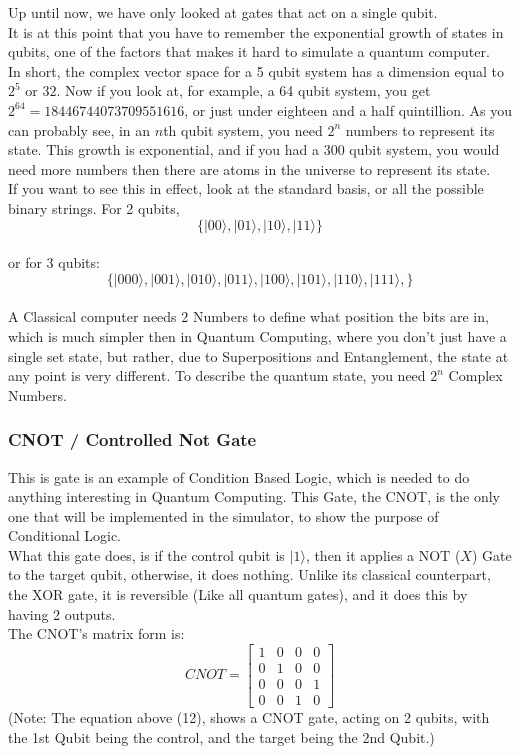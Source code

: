\documentclass[../main.tex]{subfiles}
\begin{document}
Up until now, we have only looked at gates that act on a single qubit.\\
It is at this point that you have to remember the exponential growth of
states in qubits, one of the factors that makes it hard to simulate a
quantum computer.\\
In short, the complex vector space for a 5 qubit system has a dimension
equal to \(2^5\) or \(32\). Now if you look at, for example, a 64 qubit
system, you get \(2^{64} = 18446744073709551616\), or just under eighteen
and a half quintillion. As you can probably see, in an \(n\)th qubit
system, you need \(2^n\) numbers to represent its state. This growth is
exponential, and if you had a \(300\) qubit system, you would need more
numbers then there are atoms in the universe to represent its state.\\
If you want to see this in effect, look at the standard basis, or all
the possible binary strings. For 2 qubits,\\
\[
\{\lvert00\rangle, \lvert01\rangle, \lvert10\rangle, \lvert11\rangle\}\]\\
or for 3 qubits:\\
\[
\{\lvert000\rangle, \lvert001\rangle, \lvert010\rangle, \lvert011\rangle, \lvert100\rangle, \lvert101\rangle, \lvert110\rangle, \lvert111\rangle,\}\]\\
A Classical computer needs \(2\) Numbers to define what position
the bits are in, which is much simpler then in Quantum Computing,
where you don't just have a single set state, but rather, due to
Superpositions and Entanglement, the state at any point is very different.
To describe the quantum state, you need \(2^n\) Complex Numbers. 

\subsubsection{CNOT / Controlled Not Gate}

This is gate is an example of Condition Based Logic, which is needed to
do anything interesting in Quantum Computing. This Gate, the CNOT, is
the only one that will be implemented in the simulator, to show the
purpose of Conditional Logic. \\
What this gate does, is if the control qubit is \(\lvert1\rangle\), then it
applies a NOT (\(X\)) Gate to the target qubit, otherwise, it does
nothing. Unlike its classical counterpart, the XOR gate, it is
reversible (Like all quantum gates), and it does this by having 2
outputs.\\
The CNOT's matrix form is:\\
\begin{equation}
	CNOT = \left[ \begin{matrix} 1 & 0 & 0 & 0 \\ 0 & 1 & 0 & 0 \\ 0     & 0 & 0 & 1 \\ 0 & 0 & 1  & 0\end{matrix} \right]
\end{equation}
(Note: The equation above (12), shows a CNOT gate, acting on 2 qubits, with the 1st Qubit being the control, and the target being the 2nd Qubit.)
\end{document}
